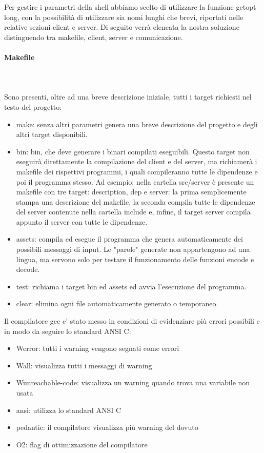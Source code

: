 \documentclass[12pt]{article}
\begin{document}
Per gestire i parametri della shell abbiamo scelto di utilizzare la funzione getopt long, con la possibilità di utilizzare sia nomi lunghi che brevi, riportati nelle relative sezioni client e server.
Di seguito verrà elencata la nostra soluzione distinguendo tra makefile, client, server e comunicazione.
\paragraph{Makefile} \mbox{}\\ \\
Sono presenti, oltre ad una breve descrizione iniziale, tutti i target richiesti nel testo del progetto: 
    	\begin{itemize}
    		\item make: senza altri parametri genera una breve descrizione del progetto e degli altri target disponibili.
   		\item bin: bin, che deve generare i binari compilati eseguibili. Questo target non eseguirà direttamente la compilazione del client e del server, ma richiamerà i makefile dei rispettivi programmi, i quali compileranno tutte le dipendenze e poi il programma stesso. Ad esempio: nella cartella src/server è presente un makefile con tre target: description, dep e server: la prima semplicemente stampa una descrizione del makefile, la seconda compila tutte le dipendenze del server contenute nella cartella include e, infine, il target server compila appunto il server con tutte le dipendenze. 
    		\item assets: compila ed esegue il programma che genera automaticamente dei possibili messaggi di input. Le "parole" generate non appartengono ad una lingua, ma servono solo per testare il funzionamento delle funzioni encode e decode.
    		\item test: richiama i target bin ed assets ed avvia l'esecuzione del programma.
    		\item clear: elimina ogni file automaticamente generato o temporaneo.
    	\end{itemize}
Il compilatore gcc e' stato messo in condizioni di evidenziare più errori possibili e in modo da seguire lo standard ANSI C:
    \begin{itemize}
        \item Werror: tutti i warning vengono segnati come errori    
        \item Wall: visualizza tutti i messaggi di warning
        \item Wunreachable-code: visualizza un warning quando trova una variabile non usata
        \item ansi: utilizza lo standard ANSI C
        \item pedantic: il compilatore visualizza più warning del dovuto
        \item O2: flag di ottimizzazione del compilatore
    \end{itemize}
\end{document}
